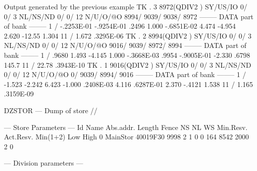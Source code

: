 \begin{landscapebody}
\begin{XMPt}{Output generated by the previous example}
 TK  .     3     8972(QDIV2   ) SY/US/IO    0/    0/   3 NL/NS/ND    0/    0/      12 N/U/O/@O    8994/    9039/    9038/    8972
--------  DATA part of bank  --------                                                                                            
      1 /  -.2253E-01  -.9254E-01   .2496       1.000      -.6851E-02   4.474      -4.954       2.620      -12.55       1.304    
     11 /   1.672       .3295E-06                                                                                                
 TK  .     2     8994(QDIV2   ) SY/US/IO    0/    0/   3 NL/NS/ND    0/    0/      12 N/U/O/@O    9016/    9039/    8972/    8994
--------  DATA part of bank  --------                                                                                            
      1 /   .9680       1.493      -4.145       1.000      -.3668E-03   .9954      -.9005E-01  -2.330       .6798       145.7    
     11 /   22.78       .3943E-10                                                                                                
 TK  .     1     9016(QDIV2   ) SY/US/IO    0/    0/   3 NL/NS/ND    0/    0/      12 N/U/O/@O       0/    9039/    8994/    9016
--------  DATA part of bank  --------                                                                                            
      1 /  -1.523      -2.242       6.423      -1.000       .2408E-03   4.116       .6287E-01   2.370      -.4121       1.538    
     11 /   1.165       .3159E-09                                                                                                
                                                                                                                                 
DZSTOR --- Dump of store //                                                                                                      
                                                                                                                                 
 --- Store Parameters ---                                                                                                        
Id    Name    Abs.addr.  Length   Fence      NS      NL      WS  Min.Resv.  Act.Resv.   Min(1+2)   Low  High                     
 0  MainStor  40019F30     9998       2       1       0       0        164       8542       2000     2     0                     
                                                                                                                                 
 --- Division parameters ---                                                                                                     
                                                                                                                                 

\end{XMPt}
\end{landscapebody}
